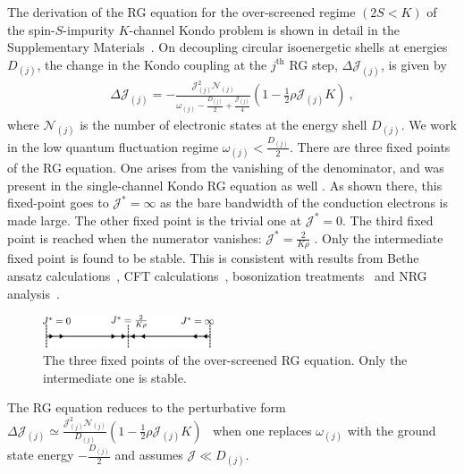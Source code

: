 \documentclass{iopart}
\begin{document}
The derivation of the RG equation for the over-screened regime \((2S < K)\) of the spin-\(S\)-impurity \(K\)-channel Kondo problem is shown in detail in the Supplementary Materials~\cite{SM}.
On decoupling circular isoenergetic shells at energies \(D_{(j)}\), the change in the Kondo coupling at the \(j^\mathrm{th}\) RG step, \(\Delta {\mathcal{J}}_{(j)}\), is given by
\begin{eqnarray}
	\Delta {\mathcal{J}}_{(j)} = -\frac{{\mathcal{J}}_{(j)}^2 \mathcal{N}_{(j)}}{\omega_{(j)} - \frac{D_{(j)}}{2} + \frac{{\mathcal{J}}_{(j)}}{4}}\left( 1 - \frac{1}{2}\rho {\mathcal{J}}_{(j)} K \right)~, \label{mckRG}
\end{eqnarray}
where \(\mathcal{N}_{(j)}\) is the number of electronic states at the energy shell \(D_{(j)}\). We work in the low quantum fluctuation regime \(\omega_{(j)} < \frac{D_{(j)}}{2}\). There are three fixed points of the RG equation. One arises from the vanishing of the denominator, and was present in the single-channel Kondo RG equation as well \cite{kondo_urg}. As shown there, this fixed-point goes to \({\mathcal{J}}^* = \infty\) as the bare bandwidth of the conduction electrons is made large. The other fixed point is the trivial one at \({\mathcal{J}}^* = 0\). The third fixed point is reached when the numerator vanishes: \({\mathcal{J}}^* = \frac{2}{K \rho}\) \cite{Gan_mchannel_1994,Kogan_2018,Kuramoto1998,Noz_blandin_1980}. Only the intermediate fixed point is found to be stable. This is consistent with results from Bethe ansatz calculations~\cite{Tsvelick_Weigmann_mchannel_1984,andrei_destri_1984,zarand_costi_2002,andrei_jerez_1995,Tsvelick_1985,Tsvelick1984}, CFT calculations~\cite{affleck_1991_overscreen,affleck1993exact,affleck_ludwig_1991}, bosonization treatments~\cite{emery_kivelson,vondelft_prl_1998} and NRG analysis~\cite{pang_cox_1991,mitchell_bulla_2014}.
\begin{figure}[htpb]
	\centering
	\includegraphics[width=0.45\textwidth]{rgflow.pdf}
	\caption{The three fixed points of the over-screened RG equation. Only the intermediate one is stable.}
	\label{rg_flow}
\end{figure}

The RG equation reduces to the perturbative form \(\Delta {\mathcal{J}}_{(j)} \simeq \frac{{\mathcal{J}}_{(j)}^2 \mathcal{N}_{(j)}}{D_{(j)}}\left( 1 - \frac{1}{2}\rho {\mathcal{J}}_{(j)} K \right)\)~\cite{Kogan_2018,Kuramoto1998,Noz_blandin_1980,tripathi2018landau} when one replaces \(\omega_{(j)}\) with the ground state energy \(-\frac{D_{(j)}}{2}\) and assumes \({\mathcal{J}} \ll D_{(j)}\).
\end{document}

